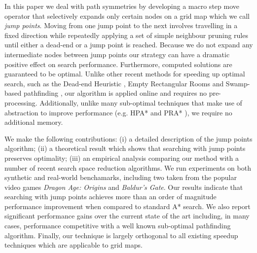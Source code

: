 In this paper we deal with path symmetries by developing a macro step move
operator that selectively expands only certain nodes on a grid map which
we call \emph{jump points}. Moving from one jump point to the next involves 
travelling in a fixed direction while repeatedly applying a set of simple
neighbour pruning rules until either a dead-end or a jump point is reached.
Because we do not expand any intermediate nodes between jump points
our strategy can have a dramatic positive effect on search performance.
Furthermore, computed solutions are guaranteed to be optimal.
Unlike other recent methods for speeding up optimal search, such as the Dead-end
Heuristic
\cite{bjornsson05}, Empty Rectangular Rooms \cite{harabor10} and Swamp-based
pathfinding \cite{pochter10}, our algorithm is applied online and requires no
pre-processing.  Additionally, unlike many sub-optimal techniques that make use 
of abstraction to improve performance (e.g. HPA* \cite{botea04} and PRA*
\cite{sturtevant05}), we require
no additional memory.

We make the following contributions: (i) a detailed description of the 
jump points algorithm; (ii) a theoretical result which shows that searching
with jump points preserves optimality;  (iii) an empirical analysis 
comparing our method with a number of recent search space reduction
algorithms.
We run experiments on both synthetic and real-world 
benchamarks, including two taken from the popular video games \emph{Dragon Age:
Origins} and \emph{Baldur's Gate}.  
Our results indicate that searching with jump points achieves more than an 
order of magnitude performance improvement when compared to standard A* search. 
We also report significant performance gains over the current state of the art
including, in many cases, performance competitive with a well known sub-optimal 
pathfinding algorithm.
Finally, our technique is largely orthogonal to all existing speedup techniques which are applicable to grid maps.

% 
